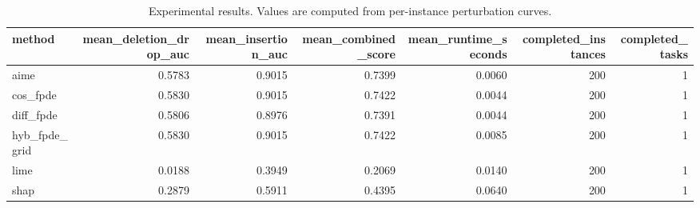 \begin{table}[t]
\caption{Experimental results. Values are computed from per-instance perturbation curves.}
\label{tab:main_results_computed}
\centering
\begin{tabular}{lrrrrrr}
\toprule
method & mean\_deletion\_drop\_auc & mean\_insertion\_auc & mean\_combined\_score & mean\_runtime\_seconds & completed\_instances & completed\_tasks \\
\midrule
aime & 0.5783 & 0.9015 & 0.7399 & 0.0060 & 200 & 1 \\
cos\_fpde & 0.5830 & 0.9015 & 0.7422 & 0.0044 & 200 & 1 \\
diff\_fpde & 0.5806 & 0.8976 & 0.7391 & 0.0044 & 200 & 1 \\
hyb\_fpde\_grid & 0.5830 & 0.9015 & 0.7422 & 0.0085 & 200 & 1 \\
lime & 0.0188 & 0.3949 & 0.2069 & 0.0140 & 200 & 1 \\
shap & 0.2879 & 0.5911 & 0.4395 & 0.0640 & 200 & 1 \\
\bottomrule
\end{tabular}

\end{table}
